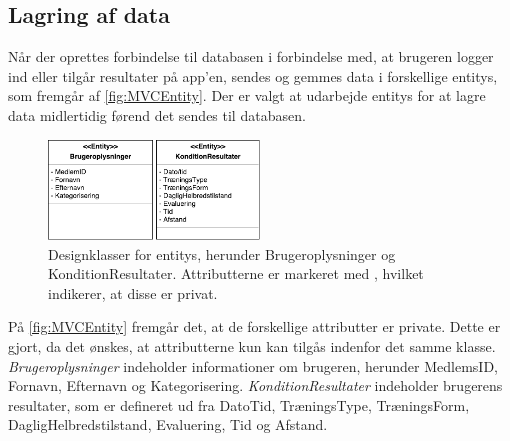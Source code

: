 \subsection*{Lagring af data}  \label{sec:entity}
Når der oprettes forbindelse til databasen i forbindelse med, at brugeren logger ind eller tilgår resultater på app'en, sendes og gemmes data i forskellige entitys, som fremgår af \autoref{fig:MVCEntity}. Der er valgt at udarbejde entitys for at lagre data midlertidig førend det sendes til databasen. 

\begin{figure} [H]
\centering
\includegraphics[width=0.5\textwidth]{figures/MVC/Entity}
\caption{Designklasser for entitys, herunder Brugeroplysninger og KonditionResultater. Attributterne er markeret med \-, hvilket indikerer, at disse er privat.}
\label{fig:MVCEntity}
\end{figure}

\noindent
På \autoref{fig:MVCEntity} fremgår det, at de forskellige attributter er private. Dette er gjort, da det ønskes, at attributterne kun kan tilgås indenfor det samme klasse. 
\textit{Brugeroplysninger} indeholder informationer om brugeren, herunder MedlemsID, Fornavn, Efternavn og Kategorisering. 
\textit{KonditionResultater} indeholder brugerens resultater, som er defineret ud fra DatoTid, TræningsType, TræningsForm, DagligHelbredstilstand, Evaluering, Tid og Afstand. 
